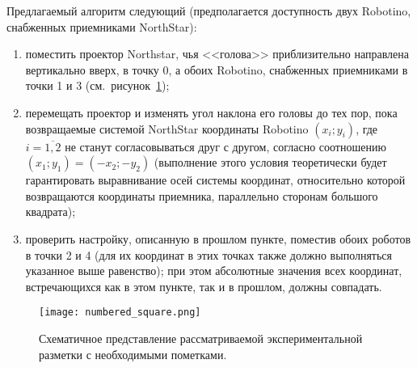 Предлагаемый алгоритм следующий (предполагается доступность двух Robotino, снабженных приемниками NorthStar):
\begin{enumerate}
	\item поместить проектор Northstar, чья <<голова>> приблизительно направлена вертикально вверх, в точку 0, а обоих Robotino, снабженных приемниками в точки 1 и 3 (см.~рисунок~\ref{img_numbered_figure});
	\item перемещать проектор и изменять угол наклона его головы до тех пор, пока возвращаемые системой NorthStar координаты Robotino $(x_i; y_i)$, где $i=\overline{1,2}$ не станут согласовываться друг с другом, согласно соотношению $(x_1; y_1) = (-x_2; -y_2)$ (выполнение этого условия теоретически будет гарантировать выравнивание осей системы координат, относительно которой возвращаются координаты приемника, параллельно сторонам большого квадрата);
	\item проверить настройку, описанную в прошлом пункте, поместив обоих роботов в точки 2 и 4 (для их координат в этих точках также должно выполняться указанное выше равенство); при этом абсолютные значения всех координат, встречающихся как в этом пункте, так и в прошлом, должны совпадать.
\end{enumerate}

\begin{figure}[h!]
	\centering
	\texttt{[image: numbered\_square.png]}
	\caption{Схематичное представление рассматриваемой экспериментальной разметки с необходимыми пометками.}
	\label{img_numbered_figure}
\end{figure}
